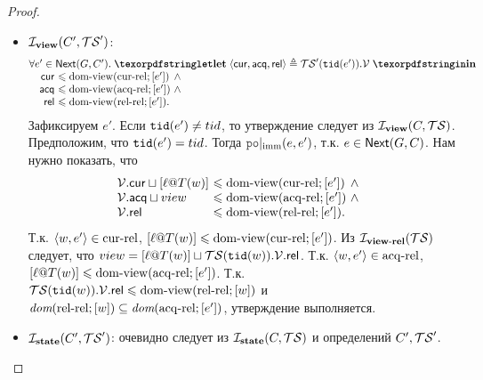 \begin{proof}
\begin{itemize}
\begin{itemize}
        \item $\mathcal{I}_{\rm \bf view}(C', \mathcal{TS}')$:
          \[\inarr{
  \forall e' \in \nextset(G, C'). \; \letdef{\tup{\viewCur, \viewAcq, \viewfRel}}{\TSf'(\lTID(e')).\View}\\
  \quad
  \begin{array}{@{}r@{~}l@{~}l}
    \viewCur  & \le \domView(\curRel; [e']) & \land {} \\
    \viewAcq  & \le \domView(\acqRel; [e']) & \land {} \\
    \viewfRel & \le \domView(\relRel; [e']). \\
  \end{array}
          }\]
          Зафиксируем $e'$. Если ${\mathtt{tid}}(e') \neq tid$, то утверждение следует из $\mathcal{I}_{\rm \bf view}(C, \mathcal{TS})$.
          Предположим, что ${\mathtt{tid}}(e') = tid$. Тогда $\imm{\lPO}(e, e')$, т.к. $e \in {\sf Next}(G, C)$.
          Нам нужно показать, что
          \[\inarr{
  \begin{array}{@{}l@{~}l@{~}l}
    \View.\viewCur \sqcup [\loc @ T(w)] & \le \domView(\curRel; [e']) & \land {} \\
    \View.\viewAcq \sqcup view & \le \domView(\acqRel; [e']) & \land {} \\
    \View.\viewfRel & \le \domView(\relRel; [e']). \\
  \end{array}
          }\]
          Т.к. ${\langle{w, e'}\rangle} \in {\rm cur\text{-}rel}$, $[\ell @ T(w)] \leqslant {\rm dom\text{-}view}({\rm cur\text{-}rel}; [e'])$.
          Из $\mathcal{I}_{\rm \bf view\text{-}rel}(\mathcal{TS})$ следует, что $view = [\ell @ T(w)] \sqcup \mathcal{TS}({\mathtt{tid}}(w)).\mathcal{V}.{\sf rel}$.
          Т.к. ${\langle{w, e'}\rangle} \in {\rm acq\text{-}rel}$, $[\ell @ T(w)] \leqslant {\rm dom\text{-}view}({\rm acq\text{-}rel}; [e'])$.
          Т.к. $\mathcal{TS}({\mathtt{tid}}(w)).\mathcal{V}.{\sf rel} \leqslant {\rm dom\text{-}view}({\rm rel\text{-}rel}; [w])$ и
          $\textit{dom}{({{\rm rel\text{-}rel}; [w]})} \subseteq \textit{dom}{({{\rm acq\text{-}rel}; [e']})}$, утверждение выполняется.
        \item $\mathcal{I}_{\rm \bf state}(C', \mathcal{TS}')$:
          очевидно следует из $\mathcal{I}_{\rm \bf state}(C, \mathcal{TS})$ и определений $C', \mathcal{TS}'$.
      \end{itemize}


\end{itemize}
\end{proof}
